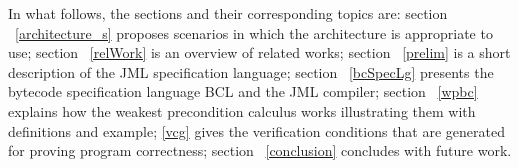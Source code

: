 In what follows, the sections and their corresponding topics are: 
section ~\ref{architecture_s} proposes scenarios in which the architecture is appropriate to use; section ~\ref{relWork} is an overview of related works; 
section  ~\ref{prelim} is a short description of the JML specification language; section ~\ref{bcSpecLg} presents the bytecode specification language BCL and the JML compiler; section ~\ref{wpbc} explains how the weakest precondition calculus works illustrating them with definitions and example; \ref{vcg} gives the verification conditions that are generated for proving program correctness; section ~\ref{conclusion} concludes with future work.  















